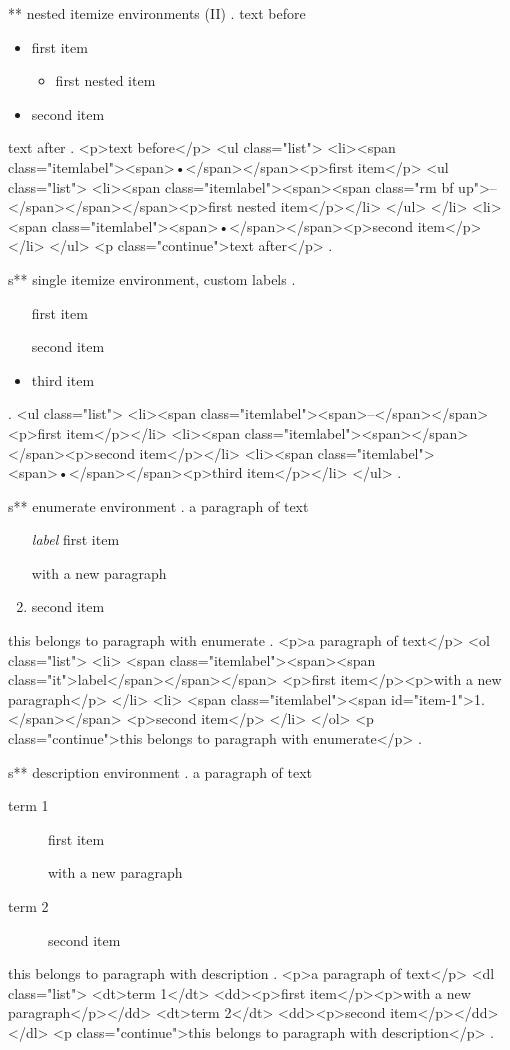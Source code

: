 ** nested itemize environments (II)
.
text before
\begin{itemize}
    \item first item
        \begin{itemize}
            \item first nested item
        \end{itemize}
    \item second item
\end{itemize}
text after
.
<p>text before</p>
<ul class="list">
<li><span class="itemlabel"><span>•</span></span><p>ﬁrst item</p>
<ul class="list">
<li><span class="itemlabel"><span><span class="rm bf up">–</span></span></span><p>ﬁrst nested item</p></li>
</ul>
</li>
<li><span class="itemlabel"><span>•</span></span><p>second item</p></li>
</ul>
<p class="continue">text after</p>
.


s** single itemize environment, custom labels
.
\begin{itemize}
    \item[\textendash] first item
    \item[] second item
    \item third item
\end{itemize}
.
<ul class="list">
<li><span class="itemlabel"><span>–</span></span><p>ﬁrst item</p></li>
<li><span class="itemlabel"><span></span></span><p>second item</p></li>
<li><span class="itemlabel"><span>•</span></span><p>third item</p></li>
</ul>
.



s** enumerate environment
.
a paragraph of text

\begin{enumerate}
    \item[\itshape label] first item

        with a new paragraph
    \item second item
\end{enumerate}
this belongs to paragraph with enumerate
.
<p>a paragraph of text</p>
<ol class="list">
<li>
<span class="itemlabel"><span><span class="it">label</span></span></span>
<p>ﬁrst item</p><p>with a new paragraph</p>
</li>
<li>
<span class="itemlabel"><span id="item-1">1.</span></span>
<p>second item</p>
</li>
</ol>
<p class="continue">this belongs to paragraph with enumerate</p>
.


s** description environment
.
a paragraph of text

\begin{description}
    \item[term 1] first item

        with a new paragraph
    \item[term 2] second item
\end{description}
this belongs to paragraph with description
.
<p>a paragraph of text</p>
<dl class="list">
<dt>term 1</dt>
<dd><p>ﬁrst item</p><p>with a new paragraph</p></dd>
<dt>term 2</dt>
<dd><p>second item</p></dd>
</dl>
<p class="continue">this belongs to paragraph with description</p>
.


